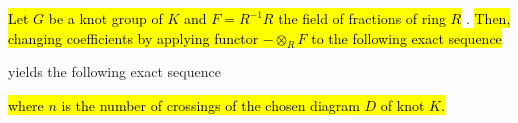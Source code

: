 \begin{proposition}
  \hl{Let $G$ be a knot group of $K$ and $F=R^{-1}R$ the field of fractions of ring $R$} \cite{atiyah}. \hl{Then, changing coefficients by applying functor $-\otimes_R F$ to the following exact sequence}
  \begin{center}
  \end{center}
  yields the following exact sequence
  \begin{center}
  \end{center}
  \hl{where $n$ is the number of crossings of the chosen diagram $D$ of knot $K$.}
\end{proposition}

